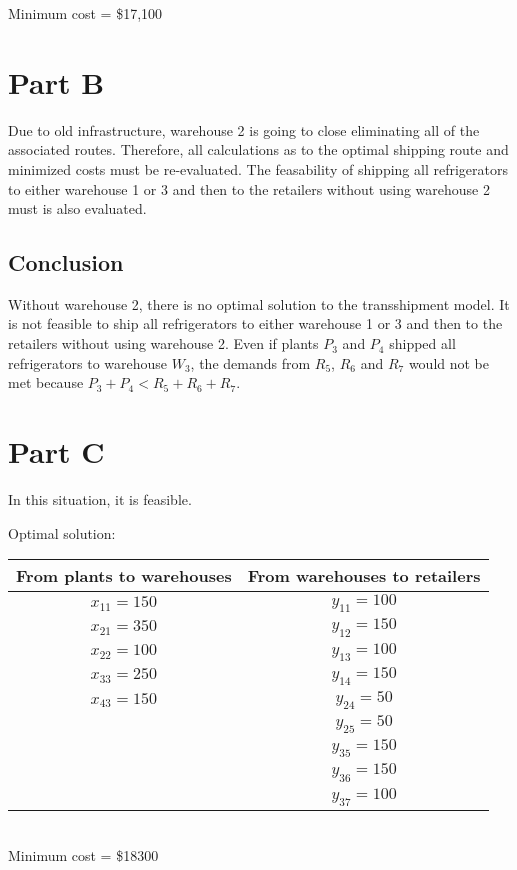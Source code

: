 \documentclass[11pt]{scrreprt}
\begin{document}
Minimum cost = \$17,100

\section{Part B}
Due to old infrastructure, warehouse 2 is going to close eliminating 
all of the associated routes. Therefore, all calculations as to the
optimal shipping route and minimized costs must be re-evaluated. The 
feasability of shipping all refrigerators to either warehouse 1 or 3
and then to the retailers without using warehouse 2 must is also
evaluated.

\subsection{Conclusion}
Without warehouse 2, there is no optimal solution to the transshipment 
model. It is not feasible to ship all refrigerators to either warehouse
1 or 3 and then to the retailers without using warehouse 2. Even if 
plants $P_3$ and $P_4$ shipped all refrigerators to warehouse $W_3$, 
the demands from $R_5$, $R_6$ and $R_7$ would not be met because
$P_3 + P_4 < R_5 + R_6 + R_7$.

\section{Part C}
In this situation, it is feasible.

Optimal solution:

\begin{tabular}{|c|c|}
	\hline From plants to warehouses & From warehouses to retailers \\
	\hline $x_{11} = 150$ & $y_{11} = 100$ \\
	\hline $x_{21} = 350$ & $y_{12} = 150$ \\
	\hline $x_{22} = 100$ & $y_{13} = 100$  \\
	\hline $x_{33} = 250$ & $y_{14} = 150$  \\
	\hline $x_{43} = 150$ & $y_{24} = 50$  \\
	\hline 				  & $y_{25} = 50$ \\
	\hline 				  & $y_{35} = 150$ \\
	\hline 				  & $y_{36} = 150$ \\
	\hline 				  & $y_{37} = 100$ \\
	\hline
\end{tabular} \\

Minimum cost = \$18300
\end{document}
